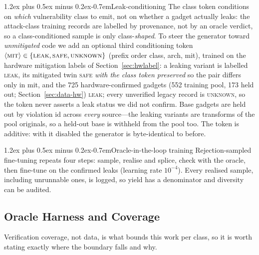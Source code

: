 \documentclass[conference]{IEEEtran}
\makeatletter
\renewcommand\paragraph{\@startsection{paragraph}{4}{\z@}%
  {1.2ex plus 0.5ex minus 0.2ex}{-0.7em}{\normalfont\normalsize\bfseries}}
\makeatother
\begin{document}
\paragraph{Leak-conditioning}
The class token conditions on \emph{which} vulnerability class to emit, not on
whether a gadget actually leaks: the attack-class training records are labelled
by provenance, not by an oracle verdict, so a class-conditioned sample is only
class-\emph{shaped}. To steer the generator toward \emph{unmitigated} code we add
an optional third conditioning token
$\langle\textsc{mit}\rangle\in\{\textsc{leak},\textsc{safe},\textsc{unknown}\}$
(prefix order class, arch, mit), trained on the hardware mitigation labels of
Section~\ref{sec:hwlabel}: a leaking variant is labelled \textsc{leak}, its
mitigated twin \textsc{safe} \emph{with the class token preserved} so the pair
differs only in mit, and the 725 hardware-confirmed gadgets (552 training pool, 173 held out; Section~\ref{sec:data-hw}) \textsc{leak};
every unverified legacy record is \textsc{unknown}, so the token never asserts a
leak status we did not confirm. Base gadgets are held out by violation id across
\emph{every} source---the leaking variants are transforms of the pool originals,
so a held-out base is withheld from the pool too. The token is additive: with it
disabled the generator is byte-identical to before.

\paragraph{Oracle-in-the-loop training}
Rejection-sampled fine-tuning repeats four steps: sample, realise and splice,
check with the oracle, then fine-tune on the confirmed leaks (learning rate
$10^{-4}$). Every realised sample, including unrunnable ones, is logged, so
yield has a denominator and diversity can be audited.


\subsection{Oracle Harness and Coverage}
\label{sec:oraclecoverage}

Verification coverage, not data, is what bounds this work per class, so it is
worth stating exactly where the boundary falls and why.
\end{document}
